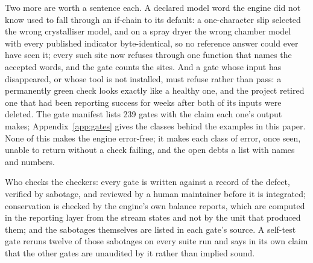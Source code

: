 \documentclass[11pt,a4paper]{article}
\begin{document}
Two more are worth a sentence each.  A declared model word the engine did
not know used to fall through an if-chain to its default: a one-character
slip selected the wrong crystalliser model, and on a spray dryer the wrong
chamber model with every published indicator byte-identical, so no
reference answer could ever have seen it; every such site now refuses
through one function that names the accepted words, and the gate counts
the sites.  And a gate whose input has disappeared, or whose tool is not
installed, must refuse rather than pass: a permanently green check looks
exactly like a healthy one, and the project retired one that had been
reporting success for weeks after both of its inputs were deleted.  The
gate manifest lists 239 gates with the claim each one's output makes;
Appendix~\ref{app:gates} gives the classes behind the examples in this
paper.  None of this makes the engine error-free; it makes each class of
error, once seen, unable to return without a check failing, and the open
debts a list with names and numbers.

Who checks the checkers: every gate is written against a record of the
defect, verified by sabotage, and reviewed by a human maintainer before it
is integrated; conservation is checked by the engine's own balance reports,
which are computed in the reporting layer from the stream states and not by
the unit that produced them; and the sabotages themselves are listed in
each gate's source.  A self-test gate reruns twelve of those sabotages on
every suite run and says in its own claim that the other gates are
unaudited by it rather than implied sound.
\end{document}
